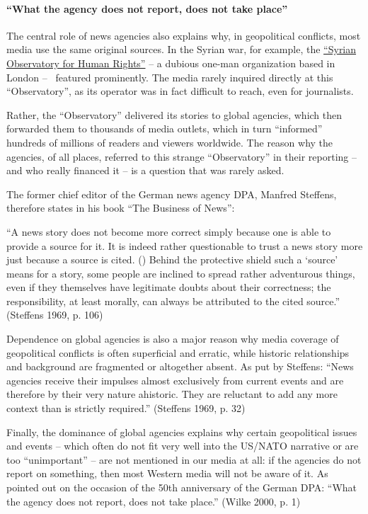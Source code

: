 \hypertarget{what-the-agency-does-not-report-does-not-take-place}{%
\paragraph{``What the agency does not report, does not take
place''}\label{what-the-agency-does-not-report-does-not-take-place}}

The central role of news agencies also explains why, in geopolitical
conflicts, most media use the same original sources. In the Syrian war,
for example, the
\href{https://en.wikipedia.org/wiki/Syrian_Observatory_for_Human_Rights}{``Syrian
Observatory for Human Rights''} -- a dubious one-man organization based
in London --~ featured prominently. The media rarely inquired directly
at this ``Observatory'', as its operator was in fact difficult to reach,
even for journalists.

Rather, the ``Observatory'' delivered its stories to global agencies,
which then forwarded them to thousands of media outlets, which in turn
``informed'' hundreds of millions of readers and viewers worldwide. The
reason why the agencies, of all places, referred to this strange
``Observatory'' in their reporting -- and who really financed it -- is a
question that was rarely asked.

The former chief editor of the German news agency DPA, Manfred Steffens,
therefore states in his book ``The Business of News'':

``A news story does not become more correct simply because one is able
to provide a source for it. It is indeed rather questionable to trust a
news story more just because a source is cited. () Behind the protective
shield such a `source' means for a story, some people are inclined to
spread rather adventurous things, even if they themselves have
legitimate doubts about their correctness; the responsibility, at least
morally, can always be attributed to the cited source.'' (Steffens 1969,
p. 106)

Dependence on global agencies is also a major reason why media coverage
of geopolitical conflicts is often superficial and erratic, while
historic relationships and background are fragmented or altogether
absent. As put by Steffens: ``News agencies receive their impulses
almost exclusively from current events and are therefore by their very
nature ahistoric. They are reluctant to add any more context than is
strictly required.'' (Steffens 1969, p. 32)

Finally, the dominance of global agencies explains why certain
geopolitical issues and events -- which often do not fit very well into
the US/NATO narrative or are too ``unimportant'' -- are not mentioned in
our media at all: if the agencies do not report on something, then most
Western media will not be aware of it. As pointed out on the occasion of
the 50th anniversary of the German DPA: ``What the agency does not
report, does not take place.'' (Wilke 2000, p. 1)

